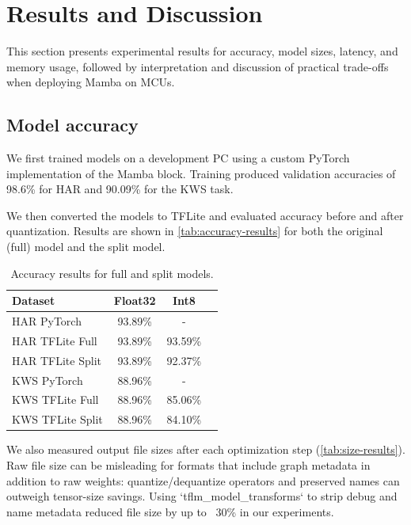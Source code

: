 \section{Results and Discussion}
\label{sec:results_and_discussion}

This section presents experimental results for accuracy, model sizes, latency, and memory usage, followed by interpretation and discussion of practical trade-offs when deploying Mamba on MCUs.

\subsection{Model accuracy}

We first trained models on a development PC using a custom PyTorch implementation of the Mamba block. Training produced validation accuracies of 98.6\% for HAR and 90.09\% for the KWS task.

We then converted the models to TFLite and evaluated accuracy before and after quantization. Results are shown in \autoref{tab:accuracy-results} for both the original (full) model and the split model.

\begin{table}[ht]
  \centering
  \caption{Accuracy results for full and split models.}
  \label{tab:accuracy-results}
  \begin{tabular}{lccc}
    Dataset & Float32 & Int8 \\
    \midrule
    HAR PyTorch & 93.89\% & - \\
    HAR TFLite Full & 93.89\% & 93.59\% \\
    HAR TFLite Split & 93.89\% & 92.37\% \\
    \midrule
    KWS PyTorch & 88.96\% & - \\
    KWS TFLite Full & 88.96\% & 85.06\% \\
    KWS TFLite Split & 88.96\% & 84.10\% \\
    \bottomrule
  \end{tabular}
\end{table}

We also measured output file sizes after each optimization step (\autoref{tab:size-results}). Raw file size can be misleading for formats that include graph metadata in addition to raw weights: quantize/dequantize operators and preserved names can outweigh tensor-size savings. Using `tflm\_model\_transforms` to strip debug and name metadata reduced file size by up to ~30\% in our experiments.

